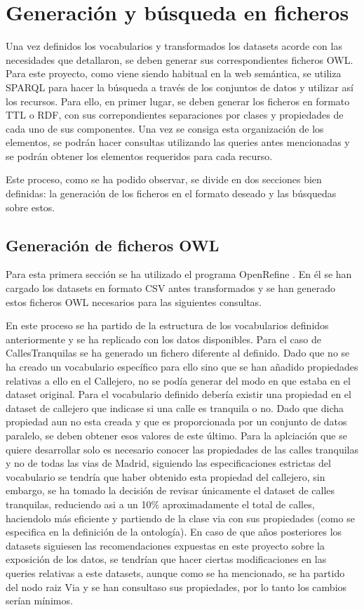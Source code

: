 \chapter{Generación y búsqueda en ficheros}

Una vez definidos los vocabularios y transformados los datasets acorde con las necesidades que detallaron, se deben generar sus correspondientes ficheros OWL.
Para este proyecto, como viene siendo habitual en la web semántica, se utiliza SPARQL para hacer la búsqueda a través de los conjuntos de datos y utilizar así los recursos. Para ello, en primer lugar, se deben generar los ficheros en formato TTL o RDF, con sus correpondientes separaciones por clases y propiedades de cada uno de sus componentes. Una vez se consiga esta organización de los elementos, se podrán hacer consultas utilizando las queries antes mencionadas y se podrán obtener los elementos requeridos para cada recurso.

Este proceso, como se ha podido observar, se divide en dos secciones bien definidas: la generación de los ficheros en el formato deseado y las búsquedas sobre estos.


\section{Generación de ficheros OWL}

Para esta primera sección se ha utilizado el programa OpenRefine \cite{pagPrinc_OpenRefine}. En él se han cargado los datasets en formato CSV antes transformados y se han generado estos ficheros OWL necesarios para las siguientes consultas.

En este proceso se ha partido de la estructura de los vocabularios definidos anteriormente y se ha replicado con los datos disponibles. 
Para el caso de CallesTranquilas se ha generado un fichero diferente al definido. Dado que no se ha creado un vocabulario específico para ello sino que se han añadido propiedades relativas a ello en el Callejero, no se podía generar del modo en que estaba en el dataset original. Para el vocabulario definido debería existir una propiedad en el dataset de callejero que indicase si una calle es tranquila o no. Dado que dicha propiedad aun no esta creada y que es proporcionada por un conjunto de datos paralelo, se deben obtener esos valores de este último. Para la aplciación que se quiere desarrollar solo es necesario conocer las propiedades de las calles tranquilas y no de todas las vias de Madrid, siguiendo las especificaciones estrictas del vocabulario se tendría que haber obtenido esta propiedad del callejero, sin embargo, se ha tomado la decisión de revisar únicamente el dataset de calles tranquilas, reduciendo asi a un 10$\%$ aproximadamente el total de calles, haciendolo más eficiente y partiendo de la clase via con sus propiedades (como se especifica en la definición de la ontología). En caso de que años posteriores los datasets siguiesen las recomendaciones expuestas en este proyecto sobre la exposición de los datos, se tendrían que hacer ciertas modificaciones en las queries relativas a este datasets, aunque como se ha mencionado, se ha partido del nodo raiz Via y se han consultaso sus propiedades, por lo tanto los cambios serían mínimos.

